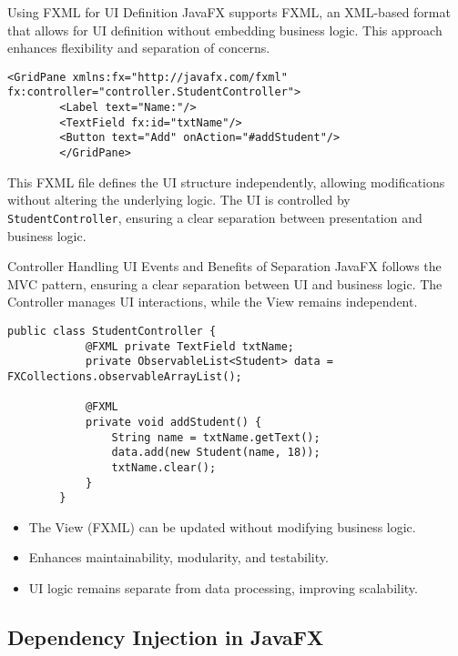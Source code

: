 \documentclass[aspectratio=169, table]{beamer}
\begin{document}
\begin{frame}[fragile]{Using FXML for UI Definition}
	\vspace{20pt}
	JavaFX supports FXML, an XML-based format that allows for UI definition  
	without embedding business logic. This approach enhances flexibility  
	and separation of concerns.
	
	\begin{lstlisting}[style=XmlStyle]
		<GridPane xmlns:fx="http://javafx.com/fxml" fx:controller="controller.StudentController">
		<Label text="Name:"/>
		<TextField fx:id="txtName"/>
		<Button text="Add" onAction="#addStudent"/>
		</GridPane>
	\end{lstlisting}
	
	This FXML file defines the UI structure independently, allowing modifications  
	without altering the underlying logic. The UI is controlled by \texttt{StudentController},  
	ensuring a clear separation between presentation and business logic.
\end{frame}


\begin{frame}[fragile]{Controller Handling UI Events and Benefits of Separation}
	\vspace{20pt}
	JavaFX follows the MVC pattern, ensuring a clear separation between UI and business logic.  
	The Controller manages UI interactions, while the View remains independent.

	\begin{lstlisting}[style=JavaStyle]
		public class StudentController {
			@FXML private TextField txtName;
			private ObservableList<Student> data = FXCollections.observableArrayList();
			
			@FXML
			private void addStudent() {
				String name = txtName.getText();
				data.add(new Student(name, 18));
				txtName.clear();
			}
		}
	\end{lstlisting}

	\begin{itemize}
		\item The View (FXML) can be updated without modifying business logic.
		\item Enhances maintainability, modularity, and testability.
		\item UI logic remains separate from data processing, improving scalability.
	\end{itemize}
\end{frame}


\subsection{Dependency Injection in JavaFX}
\end{document}

